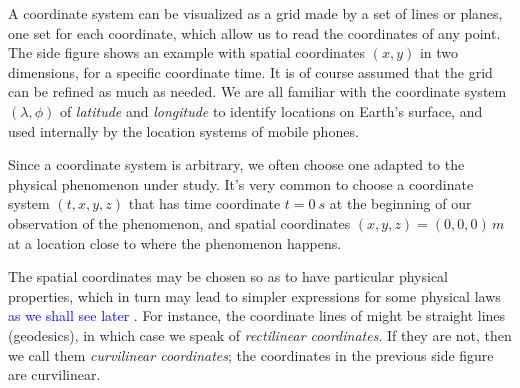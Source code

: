 \documentclass[a4paper,12pt,%
onecolumn,oneside,%
british%
]{memoir}
\renewcommand*{\|}[1][]{\nonscript\:#1\vert\nonscript\:\mathopen{}}
\newcommand*{\sect}{\S}%
\renewcommand*{\autoref}[3][\sect\,\ref]{\textcolor{blue}{#3}
\raisebox{0.6ex}{\color{blue}\miniscule%
\faIcon{angle-right}%
\;#1{#2}\;p.\,\pageref{#2}}}
\begin{document}
%
%
A coordinate system can be visualized as a grid made by a set of lines or planes, one set for each coordinate, which allow us to read the coordinates of any point. The side figure shows an example with spatial coordinates $(x,y)$ in two dimensions, for a specific coordinate time. It is of course assumed that the grid can be refined as much as needed. We are all familiar with the coordinate system $(\lambda, \phi)$ of \emph{latitude} and \emph{longitude} to identify locations on Earth's surface, and used internally by the location systems of mobile phones.

Since a coordinate system is arbitrary, we often choose one adapted to the physical phenomenon under study. It's very common to choose a coordinate system $(t,x,y,z)$ that has time coordinate $t=\qty{0}{s}$ at the beginning of our observation of the phenomenon, and spatial coordinates $(x,y,z)=(0,0,0)\,\unit{m}$ at a location close to where the phenomenon happens.

\medskip

The spatial coordinates may be chosen so as to have particular physical properties, which in turn may lead to simpler expressions for some physical laws \autoref{sec:constitutive}{as we shall see later}. For instance, the coordinate lines of might be straight lines (geodesics), in which case we speak of \emph{rectilinear coordinates}. If they are not, then we call them \emph{curvilinear coordinates}; the coordinates in the previous side figure are curvilinear.
\end{document}
